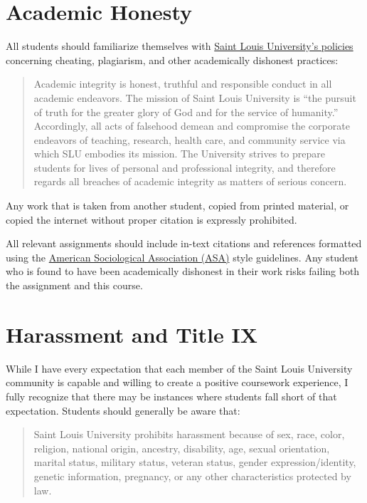 \documentclass[]{book}
\begin{document}
\hypertarget{academic-honesty}{%
\section{Academic Honesty}\label{academic-honesty}}

All students should familiarize themselves with \href{http://www.slu.edu/Documents/provost/academic_affairs/Academic\%20Integrity\%20Policy\%20FINAL\%20\%206-26-15.pd}{Saint Louis University's policies} concerning cheating, plagiarism, and other academically dishonest practices:

\begin{quote}
Academic integrity is honest, truthful and responsible conduct in all academic endeavors. The mission of Saint Louis University is ``the pursuit of truth for the greater glory of God and for the service of humanity.'' Accordingly, all acts of falsehood demean and compromise the corporate endeavors of teaching, research, health care, and community service via which SLU embodies its mission. The University strives to prepare students for lives of personal and professional integrity, and therefore regards all breaches of academic integrity as matters of serious concern.
\end{quote}

Any work that is taken from another student, copied from printed material, or copied the internet without proper citation is expressly prohibited.

All relevant assignments should include in-text citations and references formatted using the \href{https://owl.english.purdue.edu/owl/resource/583/1/}{American Sociological Association (ASA)} style guidelines. Any student who is found to have been academically dishonest in their work risks failing both the assignment and this course.

\hypertarget{harassment-and-title-ix}{%
\section{Harassment and Title IX}\label{harassment-and-title-ix}}

While I have every expectation that each member of the Saint Louis University community is capable and willing to create a positive coursework experience, I fully recognize that there may be instances where students fall short of that expectation. Students should generally be aware that:

\begin{quote}
Saint Louis University prohibits harassment because of sex, race, color, religion, national origin, ancestry, disability, age, sexual orientation, marital status, military status, veteran status, gender expression/identity, genetic information, pregnancy, or any other characteristics protected by law.
\end{quote}
\end{document}
